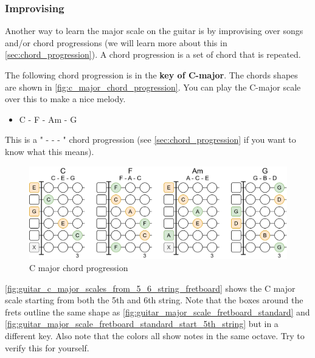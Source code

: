 \subsubsection{Improvising}

Another way to learn the major scale on the guitar is by improvising over songs and/or chord progressions (we will learn more about this in \autoref{sec:chord_progression}). A chord progression is a set of chord that is repeated.

The following chord progression is in the \textbf{key of C-major}. The chords shapes are shown in \autoref{fig:c_major_chord_progression}. You can play the C-major scale over this to make a nice melody.


\begin{itemize}
	\item C - F - Am - G
\end{itemize}

This is a " -  -  - " chord progression (see \autoref{sec:chord_progression} if you want to know what this means).

\begin{figure}[h]
	\centering
	\includegraphics[height=0.19\textheight]{../../Images/CMajor_chord_progression.png}
	\caption{C major chord progression}
	\label{fig:c_major_chord_progression}
\end{figure}

\autoref{fig:guitar_c_major_scales_from_5_6_string_fretboard} shows the C major scale starting from both the 5th and 6th string. Note that the boxes around the frets outline the same shape as \autoref{fig:guitar_major_scale_fretboard_standard} and \autoref{fig:guitar_major_scale_fretboard_standard_start_5th_string} but in a different key. Also note that the colors all show notes in the same octave. Try to verify this for yourself.

